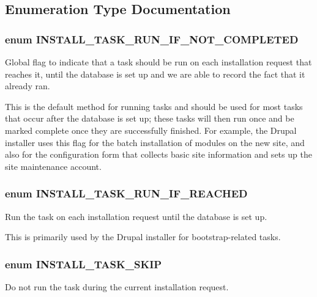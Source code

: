\subsection{Enumeration Type Documentation}
\hypertarget{install_8core_8inc_a66ef8f31ae036a8f204f18b60b88954e}{
\subsubsection[{INSTALL\_\-TASK\_\-RUN\_\-IF\_\-NOT\_\-COMPLETED}]{\setlength{\rightskip}{0pt plus 5cm}enum {\bf INSTALL\_\-TASK\_\-RUN\_\-IF\_\-NOT\_\-COMPLETED}}}
\label{install_8core_8inc_a66ef8f31ae036a8f204f18b60b88954e}
Global flag to indicate that a task should be run on each installation request that reaches it, until the database is set up and we are able to record the fact that it already ran.

This is the default method for running tasks and should be used for most tasks that occur after the database is set up; these tasks will then run once and be marked complete once they are successfully finished. For example, the Drupal installer uses this flag for the batch installation of modules on the new site, and also for the configuration form that collects basic site information and sets up the site maintenance account. \hypertarget{install_8core_8inc_a5a0aee9d902a6b08a0b74a873d60c125}{
\subsubsection[{INSTALL\_\-TASK\_\-RUN\_\-IF\_\-REACHED}]{\setlength{\rightskip}{0pt plus 5cm}enum {\bf INSTALL\_\-TASK\_\-RUN\_\-IF\_\-REACHED}}}
\label{install_8core_8inc_a5a0aee9d902a6b08a0b74a873d60c125}
Run the task on each installation request until the database is set up.

This is primarily used by the Drupal installer for bootstrap-\/related tasks. \hypertarget{install_8core_8inc_a52d485a9e7b74dd6b159ee8569f44c1a}{
\subsubsection[{INSTALL\_\-TASK\_\-SKIP}]{\setlength{\rightskip}{0pt plus 5cm}enum {\bf INSTALL\_\-TASK\_\-SKIP}}}
\label{install_8core_8inc_a52d485a9e7b74dd6b159ee8569f44c1a}
Do not run the task during the current installation request.

